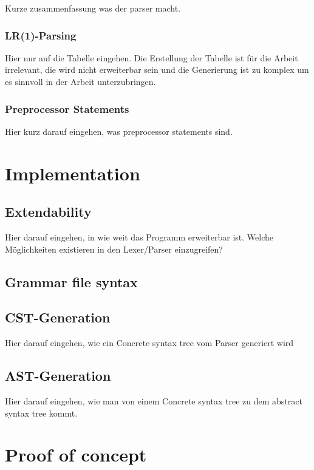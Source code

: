 Kurze zusammenfassung was der parser macht.

\subsubsection{LR(1)-Parsing}

Hier nur auf die Tabelle eingehen. Die Erstellung der Tabelle ist für die Arbeit irrelevant, die wird nicht erweiterbar sein und die Generierung ist zu komplex um es sinnvoll in der Arbeit unterzubringen.

\subsubsection{Preprocessor Statements}

Hier kurz darauf eingehen, was preprocessor statements sind.

\section{Implementation}

\subsection{Extendability}

Hier darauf eingehen, in wie weit das Programm erweiterbar ist. Welche Möglichkeiten existieren in den Lexer/Parser einzugreifen?

\subsection{Grammar file syntax}

\subsection{CST-Generation}

Hier darauf eingehen, wie ein Concrete syntax tree vom Parser generiert wird

\subsection{AST-Generation}

Hier darauf eingehen, wie man von einem Concrete syntax tree zu dem abstract syntax tree kommt.

\section{Proof of concept}

